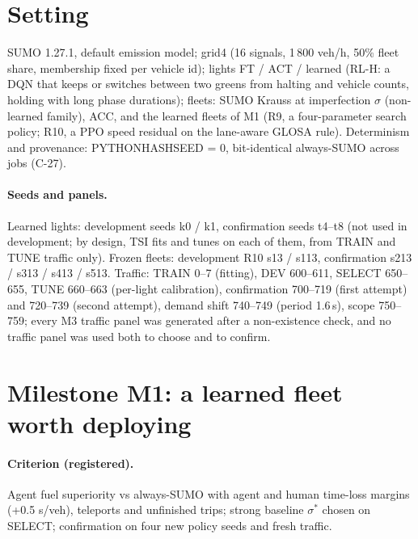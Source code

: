 \documentclass[11pt]{article}
\begin{document}
\section{Setting}
SUMO 1.27.1, default emission model; grid4 (16 signals, 1\,800 veh/h, 50\% fleet share, membership fixed per vehicle id); lights FT / ACT / learned (RL-H: a DQN that
keeps or switches between two greens from halting and vehicle counts, holding with long phase durations); fleets: SUMO Krauss at
imperfection $\sigma$ (non-learned family), ACC, and the learned fleets of M1 (R9, a four-parameter search policy; R10, a PPO speed
residual on the lane-aware GLOSA rule). Determinism and provenance: PYTHONHASHSEED = 0, bit-identical always-SUMO across jobs (C-27).
\paragraph{Seeds and panels.} Learned lights: development seeds k0 / k1, confirmation seeds t4--t8 (not used in development; by design, TSI fits
and tunes on each of them, from TRAIN and TUNE traffic only).
Frozen fleets: development R10 s13 / s113, confirmation s213 / s313 / s413 / s513. Traffic: TRAIN 0--7 (fitting), DEV 600--611, SELECT
650--655, TUNE 660--663 (per-light calibration), confirmation 700--719 (first attempt) and 720--739 (second attempt), demand shift
740--749 (period 1.6\,s), scope 750--759; every M3 traffic panel was generated after a non-existence check, and no traffic panel was used both
to choose and to confirm.

\section{Milestone M1: a learned fleet worth deploying}
\paragraph{Criterion (registered).} Agent fuel superiority vs always-SUMO with agent and human time-loss margins (+0.5 s/veh),
teleports and unfinished trips; strong baseline $\sigma^*$ chosen on SELECT; confirmation on four new policy seeds and fresh traffic.
\end{document}
